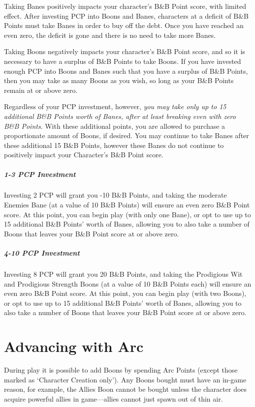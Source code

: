 \documentclass[oneside,11pt,english]{book}
\begin{document}
Taking Banes positively impacts your character's B\&B Point score, with limited effect. After investing 
PCP into Boons and Banes, characters at a deficit of B\&B Points must take Banes in order to buy off the 
debt. Once you have reached an even zero, the deficit is gone and there is no need to take more Banes. 


Taking Boons negatively impacts your character's B\&B Point score, and so it is necessary to have a 
surplus of B\&B Points to take Boons. If you have invested enough PCP into Boons and Banes such that 
you have a surplus of B\&B Points, then you may take as many Boons as you wish, so long as your B\&B 
Points remain at or above zero. 


Regardless of your PCP investment, however, \emph{you may take only up to 15 additional B\&B Points worth 
of Banes, after at least breaking even with zero B\&B Points}. With these additional points, you are allowed 
to purchase a proportionate amount of Boons, if desired. You may continue to take Banes after these 
additional 15 B\&B Points, however these Banes do not continue to positively impact your Character’s 
B\&B Point score. 


\subparagraph{1-3 PCP Investment}
Investing 2 PCP will grant you -10 B\&B Points, and taking the moderate Enemies Bane (at a value of 10 B\&B Points) will 
ensure an even zero B\&B Point score. At this point, you can begin play (with only one Bane), or opt to use up to 15 additional 
B\&B Points' worth of Banes, allowing you to also take a number of Boons that leaves your B\&B Point score at or above zero.

\subparagraph{4-10 PCP Investment}
Investing 8 PCP will grant you 20 B\&B Points, and taking the Prodigious Wit and Prodigious Strength Boons (at a value of 10 
B\&B Points each) will ensure an even zero B\&B Point score. At this point, you can begin play (with two Boons), or opt to use up 
to 15 additional B\&B Points’ worth of Banes, allowing you to also take a number of Boons that leaves your B\&B Point score at or above zero. 
\section{Advancing with Arc}
During play it is possible to add Boons by spending Arc Points (except those marked as ‘Character 
Creation only’). Any Boons bought must have an in-game reason, for example, the Allies Boon cannot be 
bought unless the character does acquire powerful allies in game—allies cannot just spawn out of thin air. 
\end{document}
